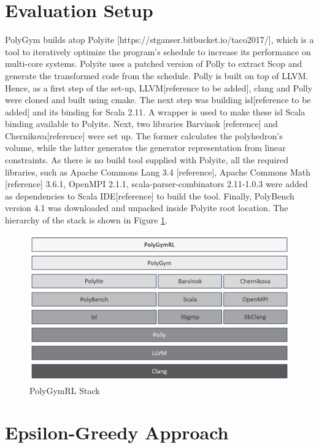 \documentclass[logo,msc]{infthesis}           %
\begin{document}
\section{Evaluation Setup}

PolyGym builds atop Polyite [https://stganser.bitbucket.io/taco2017/], which is a tool to iteratively optimize the program's schedule to increase its performance on multi-core systems. Polyite uses a patched version of Polly to extract Scop and generate the transformed code from the schedule. Polly is built on top of LLVM. Hence, as a first step of the set-up, LLVM[reference to be added], clang and Polly were cloned and built using cmake. The next step was building isl[reference to be added] and its binding for Scala 2.11. A wrapper is used to make these isl Scala binding available to Polyite. Next, two libraries Barvinok [reference] and Chernikova[reference] were set up. The former calculates the polyhedron's volume, while the latter generates the generator representation from linear constraints. As there is no build tool supplied with Polyite, all the required libraries, such as Apache Commons Lang 3.4 [reference], Apache Commons Math [reference] 3.6.1, OpenMPI 2.1.1, scala-parser-combinators 2.11-1.0.3 were added as dependencies to Scala IDE[reference] to build the tool. Finally, PolyBench version 4.1 was downloaded and unpacked inside Polyite root location. The hierarchy of the stack is shown in Figure \ref{fig::stack}.

\begin{figure}[htbp]  
  \centering
  \includegraphics[width=\textwidth]{Images/PolyGymRlStack.png}    
  \caption{PolyGymRL Stack}
  \label{fig::stack}
\end{figure}

\section{Epsilon-Greedy Approach}
\end{document}
